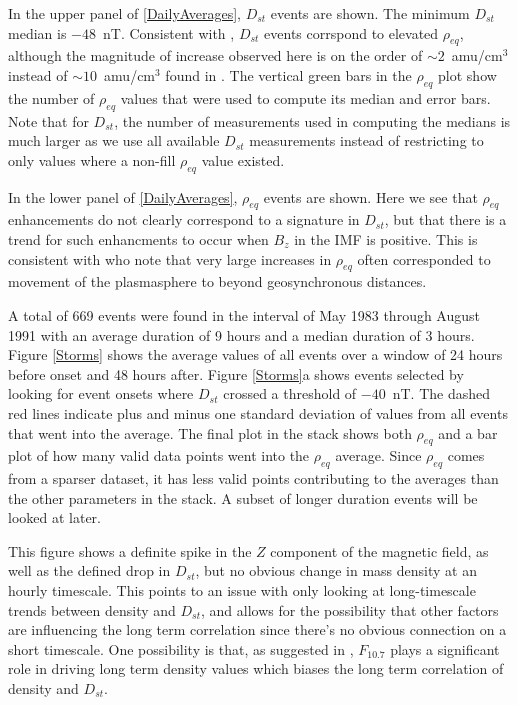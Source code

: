 \documentclass[10pt,twocolumn]{article}
\begin{document}
In the upper panel of \ref{DailyAverages}, $D_{st}$ events are shown.  The minimum $D_{st}$ median is $-48$~nT.  Consistent with \cite{Takahashi2010}, $D_{st}$ events corrspond to elevated $\rho_{eq}$, although the magnitude of increase observed here is on the order of $\sim2$~amu/cm$^3$ instead of $\sim10$~amu/cm$^3$ found in \cite{Takahashi2010}.  The vertical green bars in the $\rho_{eq}$ plot show the number of $\rho_{eq}$ values that were used to compute its median and error bars.  Note that for $D_{st}$, the number of measurements used in computing the medians is much larger as we use all available $D_{st}$ measurements instead of restricting to only values where a non-fill $\rho_{eq}$ value existed.  

In the lower panel of \ref{DailyAverages}, $\rho_{eq}$ events are shown.  Here we see that $\rho_{eq}$ enhancements do not clearly correspond to a signature in $D_{st}$, but that there is a trend for such enhancments to occur when $B_{z}$ in the IMF is positive.  This is consistent with \cite{Takahashi2010} who note that very large increases in $\rho_{eq}$ often corresponded to movement of the plasmasphere to beyond geosynchronous distances. 

A total of 669 events were found in the interval of May 1983 through August 1991 with an average duration of 9 hours and a median duration of 3 hours. Figure \ref{Storms} shows the average values of all events over a window of 24 hours before onset and 48 hours after. Figure \ref{Storms}a shows events selected by looking for event onsets where $D_{st}$ crossed a threshold of $-40$~nT. The dashed red lines indicate plus and minus one standard deviation of values from all events that went into the average. The final plot in the stack shows both $\rho_{eq}$ and a bar plot of how many valid data points went into the $\rho_{eq}$ average. Since $\rho_{eq}$ comes from a sparser dataset, it has less valid points contributing to the averages than the other parameters in the stack. A subset of longer duration events will be looked at later. 

This figure shows a definite spike in the $Z$ component of the magnetic field, as well as the defined drop in $D_{st}$, but no obvious change in mass density at an hourly timescale. This points to an issue with only looking at long-timescale trends between density and $D_{st}$, and allows for the possibility that other factors are influencing the long term correlation since there's no obvious connection on a short timescale. One possibility is that, as suggested in \cite{Takahashi2010}, $F_{10.7}$ plays a significant role in driving long term density values which biases the long term correlation of density and $D_{st}$.
\end{document}
